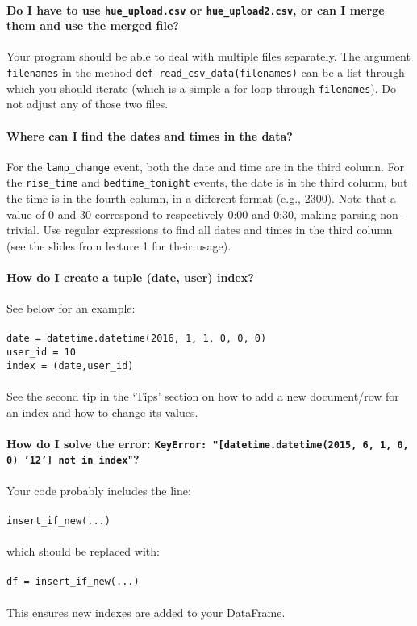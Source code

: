 \documentclass[a4paper]{report}
\theoremstyle{definition}
\begin{document}
\paragraph{Do I have to use \texttt{hue\_upload.csv} or \texttt{hue\_upload2.csv}, or can I merge them and use the merged file?}
Your program should be able to deal with multiple files separately. The argument \texttt{filenames} in the method \texttt{def read\_csv\_data(filenames)} can be a list through which you should iterate (which is a simple a for-loop through \texttt{filenames}). Do not adjust any of those two files.

\paragraph{Where can I find the dates and times in the data?}
For the \texttt{lamp\_change} event, both the date and time are in the third column. For the \texttt{rise\_time} and \texttt{bedtime\_tonight} events, the date is in the third column, but the time is in the fourth column, in a different format (e.g., 2300). Note that a value of 0 and 30 correspond to respectively 0:00 and 0:30, making parsing non-trivial. Use regular expressions to find all dates and times in the third column (see the slides from lecture 1 for their usage).

\paragraph{How do I create a tuple (date, user) index?}
See below for an example:\\\\
\texttt{date = datetime.datetime(2016, 1, 1, 0, 0, 0)} \\
\texttt{user\_id = 10} \\
\texttt{index = (date,user\_id)} \\\\
See the second tip in the `Tips' section on how to add a new document/row for an index and how to change its values.

\paragraph{How do I solve the error: \texttt{KeyError: "[datetime.datetime(2015, 6, 1, 0, 0) '12'] not in index}"?}
Your code probably includes the line:\\\\
\texttt{insert\_if\_new(...)} \\\\
which should be replaced with:\\\\
\texttt{df = insert\_if\_new(...)} \\\\
This ensures new indexes are added to your DataFrame.
\end{document}
